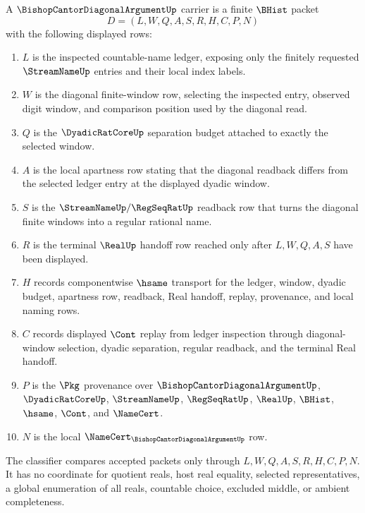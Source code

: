 \begin{definition}
\label{def:bishop-cantor-diagonal-argument-carrier}
A $\BishopCantorDiagonalArgumentUp$ carrier is a finite $\BHist$ packet
$$
D=(L,W,Q,A,S,R,H,C,P,N)
$$
with the following displayed rows:
\begin{enumerate}
\item $L$ is the inspected countable-name ledger, exposing only the finitely requested $\StreamNameUp$ entries and their local index labels.
\item $W$ is the diagonal finite-window row, selecting the inspected entry, observed digit window, and comparison position used by the diagonal read.
\item $Q$ is the $\DyadicRatCoreUp$ separation budget attached to exactly the selected window.
\item $A$ is the local apartness row stating that the diagonal readback differs from the selected ledger entry at the displayed dyadic window.
\item $S$ is the $\StreamNameUp/\RegSeqRatUp$ readback row that turns the diagonal finite windows into a regular rational name.
\item $R$ is the terminal $\RealUp$ handoff row reached only after $L,W,Q,A,S$ have been displayed.
\item $H$ records componentwise $\hsame$ transport for the ledger, window, dyadic budget, apartness row, readback, Real handoff, replay, provenance, and local naming rows.
\item $C$ records displayed $\Cont$ replay from ledger inspection through diagonal-window selection, dyadic separation, regular readback, and the terminal Real handoff.
\item $P$ is the $\Pkg$ provenance over $\BishopCantorDiagonalArgumentUp$, $\DyadicRatCoreUp$, $\StreamNameUp$, $\RegSeqRatUp$, $\RealUp$, $\BHist$, $\hsame$, $\Cont$, and $\NameCert$.
\item $N$ is the local $\NameCert_{\BishopCantorDiagonalArgumentUp}$ row.
\end{enumerate}
The classifier compares accepted packets only through $L,W,Q,A,S,R,H,C,P,N$. It has no coordinate for quotient reals, host real equality, selected representatives, a global enumeration of all reals, countable choice, excluded middle, or ambient completeness.
\end{definition}

